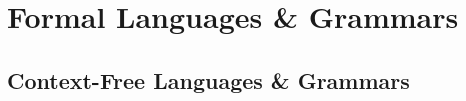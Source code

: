 \section{Formal Languages \& Grammars}
\cite{DBLP:books/daglib/0090590}

\subsection{Context-Free Languages \& Grammars}